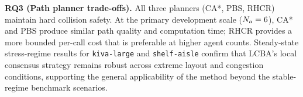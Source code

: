 \textbf{RQ3 (Path planner trade-offs).}
All three planners (CA*, PBS, RHCR) maintain hard collision safety.
At the primary development scale ($N_a = 6$), CA* and PBS produce similar
path quality and computation time; RHCR provides a more bounded per-call
cost that is preferable at higher agent counts.
Steady-state stress-regime results for \texttt{kiva-large} and \texttt{shelf-aisle}
confirm that LCBA's local consensus strategy remains robust across extreme layout
and congestion conditions, supporting the general applicability of the method
beyond the stable-regime benchmark scenarios.
